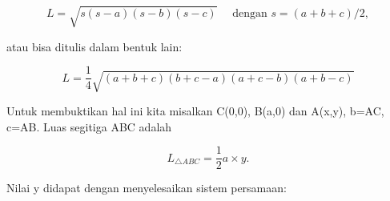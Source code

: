\documentclass[a4paper,10pt]{article}
\begin{document}
\begin{eulernotebook}
\begin{eulercomment}
\begin{eulercomment}
\begin{eulercomment}
\begin{eulercomment}
\begin{eulercomment}
\begin{eulercomment}
\begin{eulercomment}
\begin{eulercomment}
\begin{eulercomment}
\begin{eulercomment}
\begin{eulercomment}
\begin{eulercomment}
\begin{eulercomment}
\begin{eulercomment}
\begin{eulercomment}
\begin{eulercomment}
\begin{eulercomment}
\begin{eulercomment}
\begin{eulercomment}
\begin{eulercomment}
\begin{eulercomment}
\begin{eulercomment}
\begin{eulercomment}
\begin{eulercomment}
\begin{eulercomment}
\begin{eulercomment}
\begin{eulercomment}
\begin{eulercomment}
\begin{eulercomment}
\begin{eulercomment}
\begin{eulercomment}
\end{eulercomment}
\begin{eulerformula}
\[
L = \sqrt{s(s-a)(s-b)(s-c)}\quad \text{ dengan } s=(a+b+c)/2,
\]
\end{eulerformula}
\begin{eulercomment}
atau bisa ditulis dalam bentuk lain:

\end{eulercomment}
\begin{eulerformula}
\[
L = \frac{1}{4}\sqrt{(a+b+c)(b+c-a)(a+c-b)(a+b-c)}
\]
\end{eulerformula}
\begin{eulercomment}
Untuk membuktikan hal ini kita misalkan C(0,0), B(a,0) dan A(x,y),
b=AC, c=AB. Luas segitiga ABC adalah

\end{eulercomment}
\begin{eulerformula}
\[
L_{\triangle ABC}=\frac{1}{2}a\times y.
\]
\end{eulerformula}
\begin{eulercomment}
Nilai y didapat dengan menyelesaikan sistem persamaan:


\end{eulercomment}
\end{eulercomment}
\end{eulercomment}
\end{eulercomment}
\end{eulercomment}
\end{eulercomment}
\end{eulercomment}
\end{eulercomment}
\end{eulercomment}
\end{eulercomment}
\end{eulercomment}
\end{eulercomment}
\end{eulercomment}
\end{eulercomment}
\end{eulercomment}
\end{eulercomment}
\end{eulercomment}
\end{eulercomment}
\end{eulercomment}
\end{eulercomment}
\end{eulercomment}
\end{eulercomment}
\end{eulercomment}
\end{eulercomment}
\end{eulercomment}
\end{eulercomment}
\end{eulercomment}
\end{eulercomment}
\end{eulercomment}
\end{eulercomment}
\end{eulercomment}
\end{eulernotebook}
\end{document}
